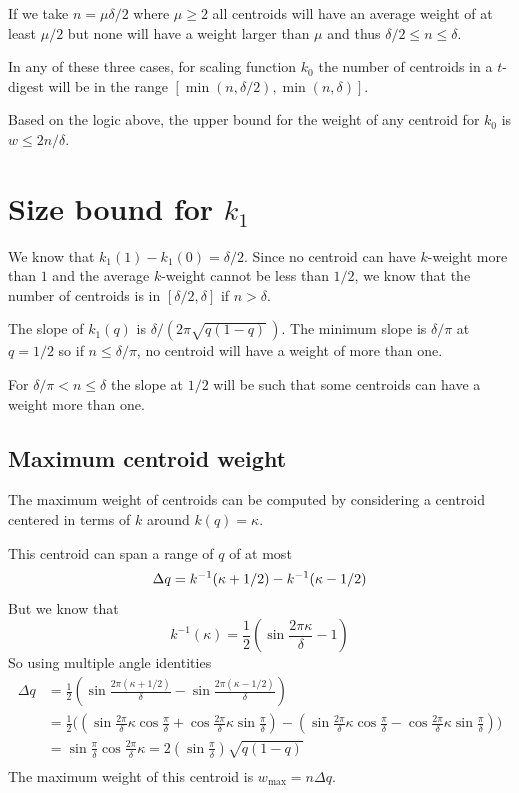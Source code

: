 \documentclass[11pt]{amsart}
\begin{document}
If we take $  n = \mu \delta /2$  where $\mu \ge 2$ all centroids will have an average weight of at least $ \mu/2 $ but none will have a weight larger than $ \mu $ and thus $\delta/2 \le n \le \delta$.

In any of these three cases, for scaling function $k_0$ the number of centroids in a  $t$-digest will be in the range $\left[\min( n,\delta/2), \min(n,\delta)\right]$.

Based on the logic above, the upper bound for the weight of any centroid for $k_0$ is $
w \le 2 n / \delta$. 
\section{Size bound for $k_1$}
We know that $k_1(1) -  k_1(0) = \delta/2$. Since no centroid can have $k$-weight more than $1$ and the average $k$-weight cannot be less than $1/2$, we know that the number of centroids is in $\left[ \delta/2 , \delta \right]$ if $n > \delta$. 

The slope of $k_1(q)$ is $\delta / ( 2\pi \sqrt{q(1-q)} \, )$. The minimum slope is 
$\delta / \pi$ at $q=1/2$ so if $n \le \delta/\pi$, no centroid will have a weight of more than one.

For $\delta/\pi < n \le \delta$ the slope at $1/2$ will be such that some centroids can have a weight more than one.
\subsection{Maximum centroid weight}

The maximum weight of centroids can be computed by considering a centroid centered in terms of $k$ around $k(q) = \kappa$. 

This centroid can span a range of $q$ of at most
\[
\Delta q = k^{-1}(\kappa+1/2) - k^{-1}(\kappa-1/2) \\
\]
But we know that
\[
k^{-1}(\kappa) = \frac 1 2 \left(   \sin \frac {2\pi \kappa} \delta -1  \right)
\]
So using multiple angle identities
\[
\begin{aligned}
\Delta q &= \frac 1 2 \left(
  { \sin \frac {2\pi (\kappa+1/2)} \delta  }  -   { \sin \frac {2\pi (\kappa-1/2)} \delta  } 
  \right) \\
&= \frac 1 2 \Biggl( 
\left( \sin \frac {2 \pi} \delta \kappa \cos \frac \pi \delta  + \cos \frac {2 \pi} \delta \kappa \sin \frac \pi \delta  \right) -
\left( \sin \frac {2 \pi} \delta \kappa \cos \frac  \pi  \delta  - \cos \frac {2 \pi} \delta \kappa \sin \frac  \pi  \delta  \right) 
\Biggr) \\
&=  
\sin \frac \pi \delta    \cos \frac {2 \pi} \delta \kappa =   2 \left( \sin \frac \pi \delta \right)    \sqrt{q(1-q)}\\
\end{aligned}
\]
The maximum weight of this centroid is  $w_{\max} = n \Delta q$.
\end{document}
